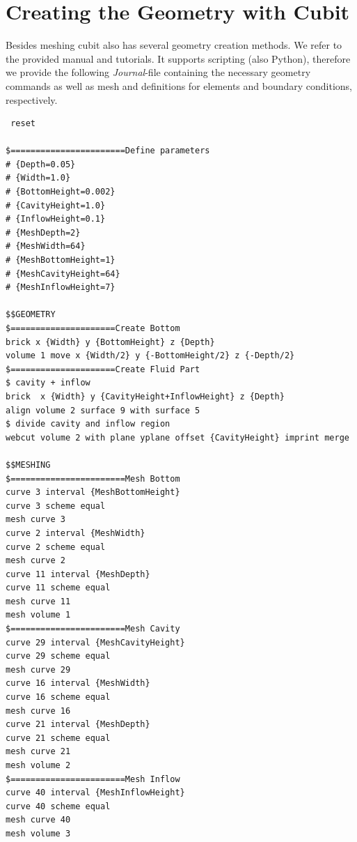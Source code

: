 \section{Creating the Geometry with Cubit}

Besides meshing cubit also has several geometry creation methods. We refer
to the provided manual and tutorials. It supports scripting (also Python),
therefore we provide the following \textit{Journal}-file containing the
necessary geometry commands as well as mesh and definitions for elements and
boundary conditions, respectively.

\begin{small} \begin{verbatim}
 reset

$=======================Define parameters
# {Depth=0.05}
# {Width=1.0}
# {BottomHeight=0.002}
# {CavityHeight=1.0}
# {InflowHeight=0.1}
# {MeshDepth=2}
# {MeshWidth=64}
# {MeshBottomHeight=1}
# {MeshCavityHeight=64}
# {MeshInflowHeight=7}

$$GEOMETRY
$=====================Create Bottom
brick x {Width} y {BottomHeight} z {Depth}
volume 1 move x {Width/2} y {-BottomHeight/2} z {-Depth/2}
$=====================Create Fluid Part
$ cavity + inflow
brick  x {Width} y {CavityHeight+InflowHeight} z {Depth}
align volume 2 surface 9 with surface 5
$ divide cavity and inflow region
webcut volume 2 with plane yplane offset {CavityHeight} imprint merge

$$MESHING
$=======================Mesh Bottom
curve 3 interval {MeshBottomHeight}
curve 3 scheme equal
mesh curve 3
curve 2 interval {MeshWidth}
curve 2 scheme equal
mesh curve 2
curve 11 interval {MeshDepth}
curve 11 scheme equal
mesh curve 11
mesh volume 1
$=======================Mesh Cavity
curve 29 interval {MeshCavityHeight}
curve 29 scheme equal
mesh curve 29
curve 16 interval {MeshWidth}
curve 16 scheme equal
mesh curve 16
curve 21 interval {MeshDepth}
curve 21 scheme equal
mesh curve 21
mesh volume 2
$=======================Mesh Inflow
curve 40 interval {MeshInflowHeight}
curve 40 scheme equal
mesh curve 40
mesh volume 3


\end{verbatim}
\end{small}
